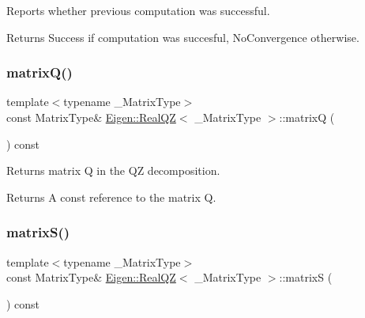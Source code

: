 Reports whether previous computation was successful. 

\begin{DoxyReturn}{Returns}
{\ttfamily Success} if computation was succesful, {\ttfamily No\+Convergence} otherwise. 
\end{DoxyReturn}
\mbox{\label{class_eigen_1_1_real_q_z_a212bc2f69ea4eff830fde70e209e40fb}} 
\subsubsection{\texorpdfstring{matrixQ()}{matrixQ()}}
{\footnotesize\ttfamily template$<$typename \+\_\+\+Matrix\+Type$>$ \\
const Matrix\+Type\& \mbox{\hyperlink{class_eigen_1_1_real_q_z}{Eigen\+::\+Real\+QZ}}$<$ \+\_\+\+Matrix\+Type $>$\+::matrixQ (\begin{DoxyParamCaption}{ }\end{DoxyParamCaption}) const\hspace{0.3cm}{\ttfamily [inline]}}



Returns matrix Q in the QZ decomposition. 

\begin{DoxyReturn}{Returns}
A const reference to the matrix Q. 
\end{DoxyReturn}
\mbox{\label{class_eigen_1_1_real_q_z_ad24d7bf534afb55adaef00f00846adaf}} 
\subsubsection{\texorpdfstring{matrixS()}{matrixS()}}
{\footnotesize\ttfamily template$<$typename \+\_\+\+Matrix\+Type$>$ \\
const Matrix\+Type\& \mbox{\hyperlink{class_eigen_1_1_real_q_z}{Eigen\+::\+Real\+QZ}}$<$ \+\_\+\+Matrix\+Type $>$\+::matrixS (\begin{DoxyParamCaption}{ }\end{DoxyParamCaption}) const\hspace{0.3cm}{\ttfamily [inline]}}



